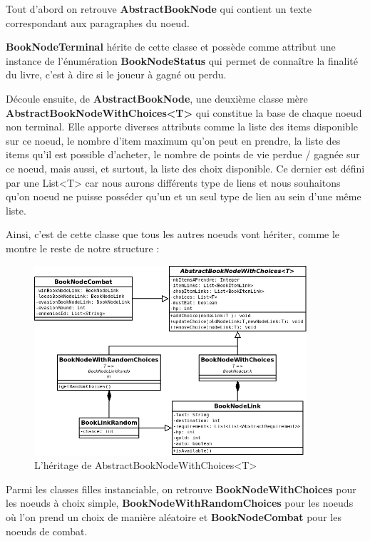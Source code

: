 			Tout d'abord on retrouve \textbf{AbstractBookNode} qui contient un texte correspondant aux paragraphes du noeud.

			\textbf{BookNodeTerminal} hérite de cette classe et possède comme attribut une instance de l'énumération \textbf{BookNodeStatus} qui permet de connaître la finalité du livre, c'est à dire si le joueur à gagné ou perdu.

			Découle ensuite, de \textbf{AbstractBookNode}, une deuxième classe mère \textbf{AbstractBookNodeWithChoices<T>} qui constitue la base de chaque noeud non terminal. Elle apporte diverses attributs comme la liste des items disponible sur ce noeud, le nombre d'item maximum qu'on peut en prendre, la liste des items qu'il est possible d'acheter, le nombre de points de vie perdue / gagnée sur ce noeud, mais aussi, et surtout, la liste des choix disponible. Ce dernier est défini par une List<T> car nous aurons différents type de liens et nous souhaitons qu'on noeud ne puisse posséder qu'un et un seul type de lien au sein d'une même liste.

			Ainsi, c'est de cette classe que tous les autres noeuds vont hériter, comme le montre le reste de notre structure :

			\begin{figure}[H]
				\centering\includegraphics[width=0.90\textwidth, keepaspectratio]{img/BookNode2.png}
				\caption{L'héritage de AbstractBookNodeWithChoices<T>}
				\label{fig:BookNode2}
			\end{figure}

			Parmi les classes filles instanciable, on retrouve \textbf{BookNodeWithChoices} pour les noeuds à choix simple, \textbf{BookNodeWithRandomChoices} pour les noeuds où l'on prend un choix de manière aléatoire et \textbf{BookNodeCombat} pour les noeuds de combat.

